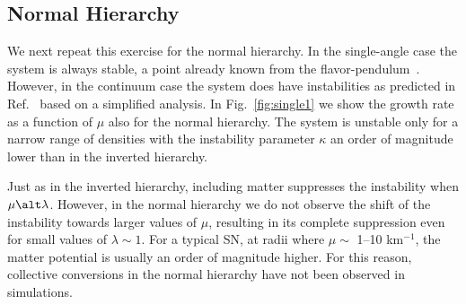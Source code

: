 \documentclass[twocolumn,prd,showpacs,
floatfix,preprintnumbers,nofootinbib]{revtex4}
\begin{document}


\subsection{Normal Hierarchy}


We next repeat this exercise for the normal hierarchy. In the
single-angle case the system is always stable, a point already known
from the flavor-pendulum~\cite{Hannestad:2006nj}. However, in the
continuum case the system does have instabilities as
predicted in Ref.~\cite{Banerjee:2011fj} based on a simplified
analysis. 
In Fig.~\ref{fig:single1} we show the growth rate as a function of $\mu$ also for the normal hierarchy.
The system is unstable only for a narrow range of
densities with the instability parameter $\kappa$ an order of magnitude lower than in the inverted hierarchy. 

Just as in the inverted hierarchy, including matter suppresses the instability when $\mu\alt\lambda$.
However, in the normal hierarchy we do not observe the shift of the instability towards larger values of $\mu$, resulting in its complete suppression even for small values of $\lambda \sim 1$. 
For a typical SN, at radii where $\mu \sim$ 1--10 km$^{-1}$, the matter potential is usually an order of magnitude higher.
For this reason, collective conversions in the normal hierarchy have not been observed in simulations.
\end{document}
